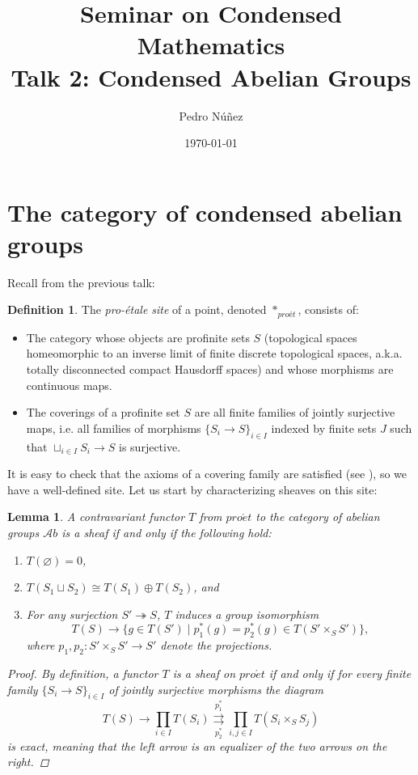 \documentclass[11pt,A4]{article}
\title{Seminar on Condensed Mathematics \\ \large Talk 2: Condensed Abelian Groups}
\author{Pedro Núñez}
\date{\today}
\theoremstyle{plain}
\newtheorem{lm}[thm]{Lemma}
\theoremstyle{definition}
\newtheorem{defn}[thm]{Definition}
\theoremstyle{remark}
\newcommand{\Ab}{\mathscr{A}b}
\newcommand{\pe}{pro\acute{e}t}
\newcommand{\op}{\oplus}
\begin{document}
\maketitle

\tableofcontents

\section{The category of condensed abelian groups}

Recall from the previous talk:

\begin{defn}
    The \textit{pro-étale site} of a point, denoted $*_{proét}$, consists of:
    \begin{itemize}
	\item The category whose objects are profinite sets $S$ (topological spaces homeomorphic to an inverse limit of finite discrete topological spaces, a.k.a. totally disconnected compact Hausdorff spaces) and whose morphisms are continuous maps.
	\item The coverings of a profinite set $S$ are all finite families of jointly surjective maps, i.e. all families of morphisms $\{ S_{i}\to S\}_{i\in I}$ indexed by finite sets $J$ such that $\sqcup_{i\in I}S_{i}\to S$ is surjective.
    \end{itemize}
\end{defn}

It is easy to check that the axioms of a covering family are satisfied (see \cite[\href{https://stacks.math.columbia.edu/tag/00VH}{Tag 00VH}]{sta19}), so we have a well-defined site.
Let us start by characterizing sheaves on this site:

\begin{lm}\label{lm:pesheaves}
    A contravariant functor $T$ from $\pe$ to the category of abelian groups $\Ab$ is a sheaf if and only if the following hold:
    \begin{enumerate}[label=\roman*)]
	\item $T(\varnothing)=0$,
	\item $T(S_{1}\sqcup S_{2})\cong T(S_{1})\op T(S_{2})$, and
	\item For any surjection $S'\twoheadrightarrow S$, $T$ induces a group isomorphism
	    \[ T(S)\to \{ g\in T(S') \mid p_{1}^{*}(g)=p_{2}^{*}(g) \in T(S'\times_{S}S') \}, \]
	    where $p_{1},p_{2}\colon S'\times_{S}S'\to S'$ denote the projections.
    \end{enumerate}
    \begin{proof}
	By definition, a functor $T$ is a sheaf on $\pe$ if and only if for every finite family $\{ S_{i}\to S\}_{i\in I}$ of jointly surjective morphisms the diagram
	\[ T(S)\to \prod_{i\in I} T(S_{i})\overset{p_{1}^{*}}{\underset{p_{2}^{*}}{\rightrightarrows}}\prod_{i,j\in I} T(S_{i}\times_{S} S_{j}) \]
	is exact, meaning that the left arrow is an equalizer of the two arrows on the right.
    \end{proof}
\end{lm}



\end{document}
